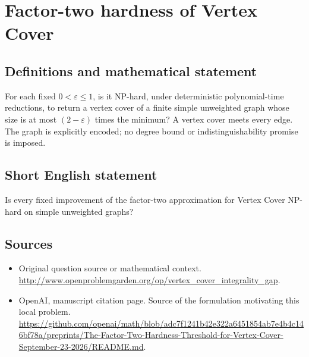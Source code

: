 \documentclass[11pt]{article}
\begin{document}
\section*{Factor-two hardness of Vertex Cover}\label{statement}
\subsection{Definitions and mathematical statement}
For each fixed $0<\varepsilon\le1$, is it NP-hard, under deterministic polynomial-time reductions, to return a vertex cover of a finite simple unweighted graph whose size is at most $(2-\varepsilon)$ times the minimum? A vertex cover meets every edge. The graph is explicitly encoded; no degree bound or indistinguishability promise is imposed.

\subsection{Short English statement}
Is every fixed improvement of the factor-two approximation for Vertex Cover NP-hard on simple unweighted graphs?

\subsection{Sources}
\begin{itemize}
\item[S1] Original question source or mathematical context.
\url{http://www.openproblemgarden.org/op/vertex_cover_integrality_gap}.
\item[S2] OpenAI, manuscript citation page. Source of the formulation motivating this local problem.
\url{https://github.com/openai/math/blob/adc7f1241b42e322a6451854ab7e4b4c146bf78a/preprints/The-Factor-Two-Hardness-Threshold-for-Vertex-Cover-September-23-2026/README.md}.
\end{itemize}
\end{document}
